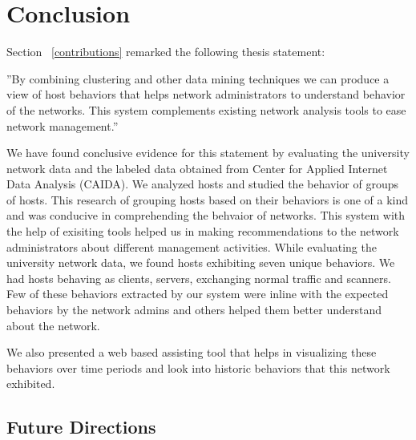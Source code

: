 
\chapter{Conclusion} \label{chap:conclusion}

Section ~\ref{contributions} remarked the following thesis statement:

''By combining clustering and other data mining techniques we can produce a view of host behaviors that helps network administrators to understand behavior of the networks. This system complements existing network analysis tools to ease network management.''

We have found conclusive evidence for this statement by evaluating the university network data and the labeled data obtained from Center for Applied Internet Data Analysis (CAIDA). We analyzed hosts and studied the behavior of groups of hosts. This research of grouping hosts based on their behaviors is one of a kind and was conducive in comprehending the behvaior of networks. This system with the help of exisiting tools helped us in making recommendations to the network administrators about different management activities.
While evaluating the university network data, we found hosts exhibiting seven unique behaviors. We had hosts behaving as clients, servers, exchanging normal traffic and scanners. Few of these behaviors extracted by our system were inline with the expected behaviors by the network admins and others helped them better understand about the network.   

We also presented a web based assisting tool that helps in visualizing these behaviors over time periods and look into historic behaviors that this network exhibited.



\section{Future Directions}

